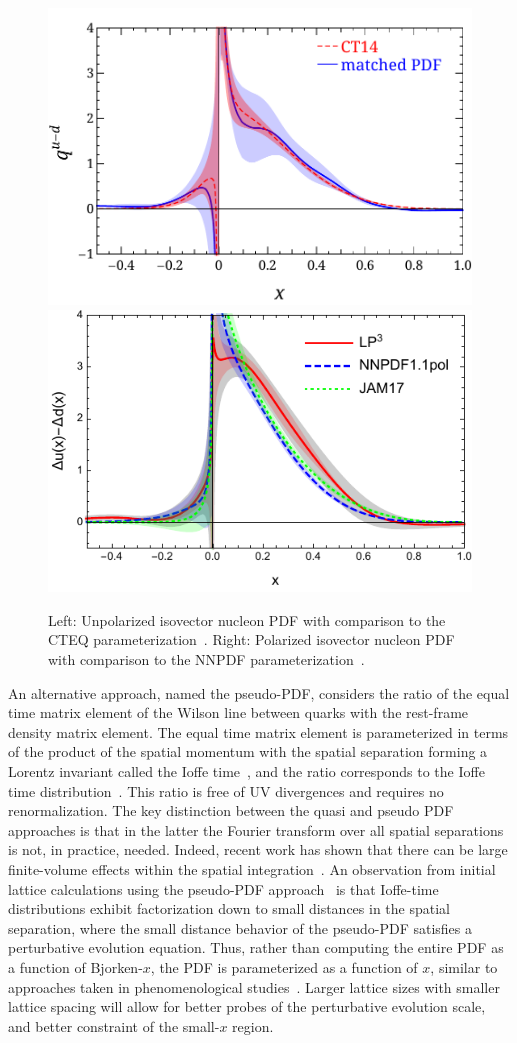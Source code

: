 \begin{figure}[h!]
	\centering
	\includegraphics[width=0.45\columnwidth]{figures/LP3-PDF-CT14}\hspace{1cm}
	\includegraphics[width=0.45\columnwidth]{figures/a09m130-helicity-comp}
	\caption{Left: Unpolarized isovector nucleon PDF with comparison to the CTEQ parameterization~\cite{Chen:2018xof}.
		Right: Polarized isovector nucleon PDF with comparison to the NNPDF parameterization~\cite{Lin:2018qky}.}
	\label{fig_quasipdf}
\end{figure}

An alternative approach, named the pseudo-PDF, considers the ratio of the equal time matrix element of the Wilson line between quarks with the rest-frame density matrix element. The equal time matrix element is parameterized in terms of the product of the spatial momentum with the spatial separation forming a Lorentz invariant called the Ioffe time~\cite{Ioffe:1969kf,Braun:1994jq}, and the ratio corresponds to the Ioffe time distribution~\cite{Radyushkin:2016hsy,Radyushkin:2017cyf}.
This ratio is free of UV divergences and requires no renormalization. The key distinction between the quasi and pseudo PDF approaches is that in the latter the Fourier transform over all spatial separations is not, in practice, needed. Indeed, recent work has shown that there can be large finite-volume effects within the spatial integration~\cite{Briceno:2018lfj}. An observation from initial lattice calculations using the pseudo-PDF approach~\cite{Karpie:2018zaz,Karpie:2018zaz}  is that Ioffe-time distributions exhibit factorization down to small distances in the spatial separation, where the small distance behavior of the pseudo-PDF  satisfies a perturbative  evolution equation. Thus, rather than computing the entire PDF as a function of Bjorken-$x$, the PDF is parameterized as a function of $x$, similar to approaches taken in phenomenological studies~\cite{Ball:2017nwa,Accardi:2016qay}. Larger lattice sizes with smaller lattice spacing will allow for better probes of the perturbative evolution scale, and better constraint of the small-$x$ region.

